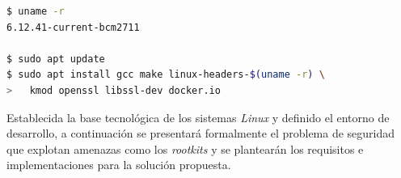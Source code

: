 \begin{code}[h!]
\begin{lstlisting}[language=bash]
$ uname -r
6.12.41-current-bcm2711

$ sudo apt update
$ sudo apt install gcc make linux-headers-$(uname -r) \
>   kmod openssl libssl-dev docker.io
\end{lstlisting}
\caption[Instalación del entorno de desarrollo]{Instalación del entorno de desarrollo en \textit{Armbian} basado en \textit{Ubuntu Noble}.}
\label{cod:dev_env_install}
\end{code}

\newpage

Establecida la base tecnológica de los sistemas \textit{Linux} y definido el entorno de desarrollo, a continuación se presentará formalmente el problema de seguridad que explotan amenazas como los \textit{rootkits} y se plantearán los requisitos e implementaciones para la solución propuesta.
